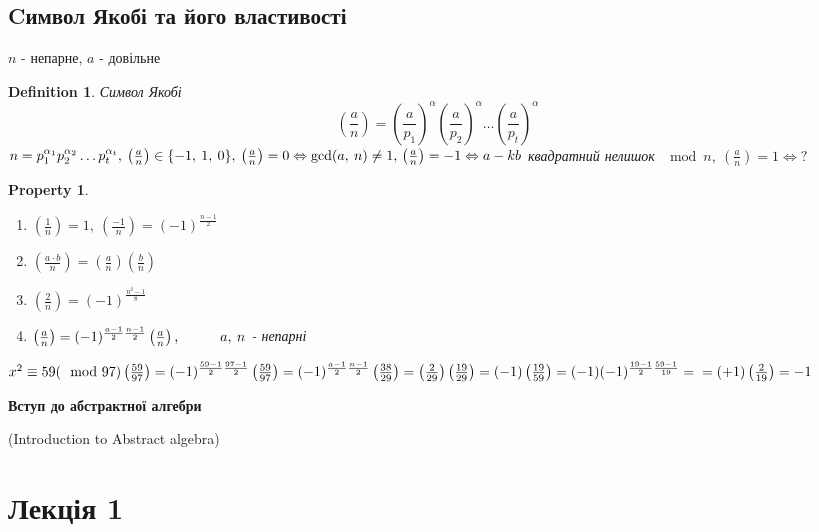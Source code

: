 \documentclass[a4paper,12pt, centered]{bookest}
\newtheorem{definition}{Definition}[section]
\newtheorem*{property*}{Property}
\newcommand\tab[1][1cm]{\hspace*{#1}}
\begin{document}
\section{Cимвол Якобі та його властивості}
$n$ - непарне, $a$ - довільне
\begin{definition}Символ Якобі
	$$\left(\frac an\right)=\left(\frac a{p_1}\right)^\alpha\left(\frac a{p_2}\right)^\alpha\dots\left(\frac a{p_t}\right)^\alpha$$
	$n=p_1^{\alpha_1}p_2^{\alpha_2}\dots p_t^{\alpha_t},\>\left(\frac an\right)\in\{-1,\>1,\>0\},\>\left(\frac an\right)=0\Leftrightarrow\gcd(a,\>n)\ne 1,\\\left(\frac an\right)=-1\Leftrightarrow a-kb$ квадратний нелишок $\mod n,\>\left(\frac an\right)=1\Leftrightarrow?$
\end{definition}
\begin{property*}$ $
	\begin{enumerate}
		\item $\left(\frac 1n\right)=1,\>\left(\frac {-1}n\right)=(-1)^{\frac{n-1}{2}}$
		\item $\left(\frac {a\cdot b}n\right)=\left(\frac an\right)\left(\frac bn\right)$
		\item $\left(\frac 2n\right)=(-1)^{\frac{n^2-1}{8}}$
		\item $\left(\frac an\right)=(-1)^{\frac{a-1}{2}\frac{n-1}{2}}\left(\frac an\right),\tab a,\>n$ - непарні
	\end{enumerate}
\end{property*}
\begin{example}
	$x^2\equiv 59(\mod 97)\\\left(\frac {59}{97}\right)=(-1)^{\frac{59-1}{2}\frac{97-1}{2}}\left(\frac {59}{97}\right)=(-1)^{\frac{a-1}{2}\frac{n-1}{2}}\left(\frac {38}{29}\right)=\left(\frac {2}{29}\right)\left(\frac {19}{29}\right)=(-1) \left(\frac {19}{59}\right)=(-1)(-1)^{\frac{19-1}{2}\frac{59-1}{19}}=\\=(+1)\left(\frac {2}{19}\right)=-1$
\end{example}
\newpage
\thispagestyle{empty}
 \hspace{0pt}
\vfill
\begin{center}
	\LARGE{\textbf{Вступ до абстрактної алгебри}}
\end{center}
\begin{center}
	(Introduction to Abstract algebra)
\end{center}
\vfill
\hspace{0pt}
\pagebreak
\newpage
\chapter{Лекція 1}
\end{document}
